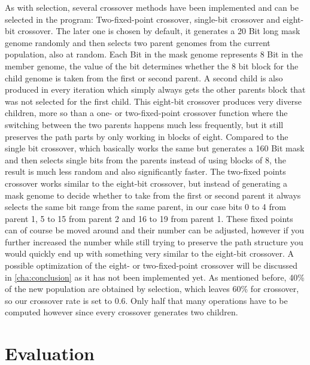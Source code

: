 As with selection, several crossover methods have been implemented and can be selected in the program: Two-fixed-point crossover, single-bit crossover and eight-bit crossover. The later one is chosen by default, it generates a 20 Bit long mask genome randomly and then selects two parent genomes from the current population, also at random. Each Bit in the mask genome represents 8 Bit in the member genome, the value of the bit determines whether the 8 bit block for the child genome is taken from the first or second parent. A second child is also produced in every iteration which simply always gets the other parents block that was not selected for the first child. This eight-bit crossover produces very diverse children, more so than a one- or two-fixed-point crossover function where the switching between the two parents happens much less frequently, but it still preserves the path parts by only working in blocks of eight. Compared to the single bit crossover, which basically works the same but generates a 160 Bit mask and then selects single bits from the parents instead of using blocks of 8, the result is much less random and also significantly faster.
The two-fixed points crossover works similar to the eight-bit crossover, but instead of generating a mask genome to decide whether to take from the first or second parent it always selects the same bit range from the same parent, in our case bits 0 to 4 from parent 1, 5 to 15 from parent 2 and 16 to 19 from parent 1. These fixed points can of course be moved around and their number can be adjusted, however if you further increased the number while still trying to preserve the path structure you would quickly end up with something very similar to the eight-bit crossover.
A possible optimization of the eight- or two-fixed-point crossover will be discussed in \ref{cha:conclusion} as it has not been implemented yet.
As mentioned before, 40\% of the new population are obtained by selection, which leaves 60\% for crossover, so our crossover rate is set to 0.6. Only half that many operations have to be computed however since every crossover generates two children.

\section{Evaluation} %
\label{sec:evaluation}

